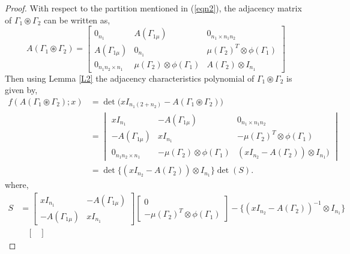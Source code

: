 \documentclass[12pt,a4paper]{article}
\theoremstyle{definition}
\theoremstyle{remark}
\begin{document}
        \begin{proof}
            With respect to the partition mentioned in (\ref{eqn2}), the adjacency matrix of $\Gamma_1\circledast\Gamma_2$ can be written as, 
        \[A(\Gamma_1\circledast\Gamma_2)=\begin{bmatrix}
            0_{n_1}& A(\Gamma_{1\mu})& 0_{n_1\times n_1n_2}\\ 
            A(\Gamma_{1\mu})& 0_{n_1}& \mu(\Gamma_2)^T\otimes\phi(\Gamma_1)\\
            0_{n_1n_2\times n_1}& \mu(\Gamma_2)\otimes\phi(\Gamma_1)& A(\Gamma_2)\otimes I_{n_1}
        \end{bmatrix}\]
        Then using Lemma \ref{L2} the adjacency characteristics polynomial of $\Gamma_1\circledast\Gamma_2$ is given by,
        \begin{equation*}
        \begin{split}
            f(A(\Gamma_1\circledast\Gamma_2);x)&= \det\big(xI_{n_1(2+n_2)}-A(\Gamma_1\circledast\Gamma_2)\big)\\
            &=\begin{vmatrix}
                xI_{n_1}& -A(\Gamma_{1\mu})& 0_{n_1\times n_1n_2}\\
                -A(\Gamma_{1\mu})& xI_{n_1}& -\mu(\Gamma_2)^T\otimes\phi(\Gamma_1)\\
                0_{n_1n_2\times n_1}& -\mu(\Gamma_2)\otimes\phi(\Gamma_1)& (xI_{n_2}-A(\Gamma_2))\otimes I_{n_1})
            \end{vmatrix}\\
            &=\det\{(xI_{n_2}-A(\Gamma_2))\otimes I_{n_1}\}\det(S).
        \end{split}
        \end{equation*}
        where,
        \begin{equation*}
            \begin{split}
                S&=\begin{bmatrix}
                xI_{n_1}& -A(\Gamma_{1\mu})\\
                -A(\Gamma_{1\mu})& xI_{n_1}
            \end{bmatrix} \begin{bmatrix}
                0\\
                -\mu(\Gamma_2)^T\otimes\phi(\Gamma_1)
            \end{bmatrix} - \{(xI_{n_2}-A(\Gamma_2))^{-1}\otimes I_{n_1}\}\\
            &~~~~\begin{bmatrix}

\end{bmatrix}
\end{split}
\end{equation*}
\end{proof}
\end{document}
